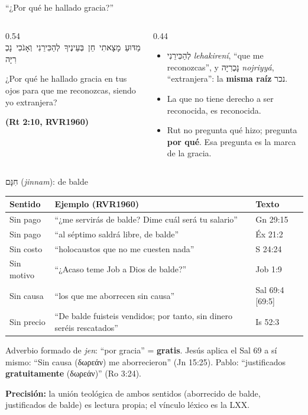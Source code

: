 \documentclass[hyperref={bookmarks=false},aspectratio=169]{beamer}
\newcommand{\heb}[1]{\mbox{\foreignlanguage{hebrew}{#1}}}
\newcommand{\grc}[1]{\foreignlanguage{ancientgreek}{#1}}
\newcommand{\fuente}[1]{\par\hfill{\upshape\bfseries\footnotesize\textcolor{azul}{#1}}}
\newcommand{\destacar}[1]{\textbf{\textcolor{azul}{#1}}}
\newcommand{\precision}[1]{{\footnotesize\color{gris}\textbf{Precisión:} #1}}
\begin{document}
\begin{frame}{``¿Por qué he hallado gracia?''}
\begin{columns}[c,onlytextwidth]
\begin{column}{0.54\textwidth}
\centering\heb{מַדּוּעַ מָצָאתִי חֵן בְּעֵינֶיךָ לְהַכִּירֵנִי וְאָנֹכִי נָכְרִיָּה}
\begin{cita}¿Por qué he hallado gracia en tus ojos para que me reconozcas, siendo yo extranjera?\fuente{(Rt 2:10, RVR1960)}\end{cita}
\end{column}
\begin{column}{0.44\textwidth}\small\RaggedRight
\begin{itemize}
\item \heb{לְהַכִּירֵנִי} \emph{lehakirení}, ``que me reconozcas'', y \heb{נָכְרִיָּה} \emph{nojriyyá}, ``extranjera'': la \destacar{misma raíz} \heb{נכר}.
\item La que no tiene derecho a ser reconocida, es reconocida.
\item Rut no pregunta qué hizo; pregunta \destacar{por qué}. Esa pregunta es la marca de la gracia.
\end{itemize}
\end{column}
\end{columns}
\end{frame}

\begin{frame}{\heb{חִנָּם} (\emph{jinnam}): de balde}
\scriptsize\renewcommand{\arraystretch}{1.15}
\begin{tabular}{@{}>{\RaggedRight\arraybackslash}p{2.0cm}>{\RaggedRight\arraybackslash}p{7.2cm}>{\RaggedRight\arraybackslash}p{2.4cm}@{}}
\toprule
\textbf{Sentido} & \textbf{Ejemplo (RVR1960)} & \textbf{Texto} \\ \midrule
Sin pago & ``¿me servirás de balde? Dime cuál será tu salario'' & Gn 29:15 \\
Sin pago & ``al séptimo saldrá libre, de balde'' & Éx 21:2 \\
Sin costo & ``holocaustos que no me cuesten nada'' & 2 S 24:24 \\
Sin motivo & ``¿Acaso teme Job a Dios de balde?'' & Job 1:9 \\
Sin causa & ``los que me aborrecen sin causa'' & Sal 69:4 [69:5] \\
Sin precio & ``De balde fuisteis vendidos; por tanto, sin dinero seréis rescatados'' & Is 52:3 \\
\bottomrule
\end{tabular}\par\medskip
\small Adverbio formado de \emph{jen}: ``por gracia'' = \destacar{gratis}. Jesús aplica el Sal 69 a sí mismo: ``Sin causa (\grc{δωρεάν}) me aborrecieron'' (Jn 15:25). Pablo: ``justificados \destacar{gratuitamente} (\grc{δωρεάν})'' (Ro 3:24).\par\smallskip
\precision{la unión teológica de ambos sentidos (aborrecido de balde, justificados de balde) es lectura propia; el vínculo léxico es la LXX.}
\end{frame}
\end{document}
